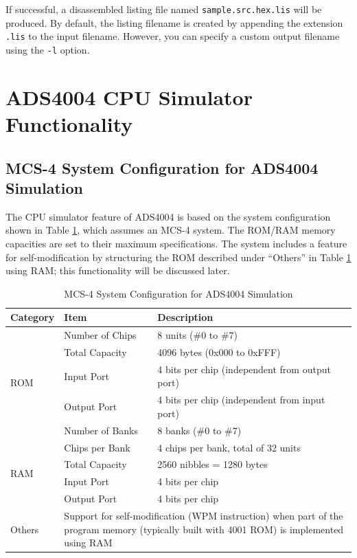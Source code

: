 If successful, a disassembled listing file named \texttt{sample.src.hex.lis} will be produced.  
By default, the listing filename is created by appending the extension \texttt{.lis} to the input filename.  
However, you can specify a custom output filename using the \texttt{-l} option.

\section{ADS4004 CPU Simulator Functionality}
\subsection{MCS-4 System Configuration for ADS4004 Simulation}
The CPU simulator feature of ADS4004 is based on the system configuration shown in Table \ref{tb:ADS4004SYSTEMCONFIG}, which assumes an MCS-4 system.  
The ROM/RAM memory capacities are set to their maximum specifications.  
The system includes a feature for self-modification by structuring the ROM described under ``Others'' in Table \ref{tb:ADS4004SYSTEMCONFIG} using RAM; this functionality will be discussed later.

\begin{table}
\centering
\begin{tabular}{|l|l|p{9cm}|}
\hline
\rowcolor{LightPurple}
\textbf{Category} & \textbf{Item} & \textbf{Description} \\
\hline
\multirow{5}{*}{ROM} & Number of Chips & 8 units (\#0 to \#7) \\
\cline{2-3}
 & Total Capacity & 4096 bytes (0x000 to 0xFFF) \\
\cline{2-3}
 & Input Port & 4 bits per chip (independent from output port) \\
\cline{2-3}
 & Output Port & 4 bits per chip (independent from input port) \\
\cline{2-3}
 & Number of Banks & 8 banks (\#0 to \#7) \\
\hline
\multirow{4}{*}{RAM} & Chips per Bank & 4 chips per bank, total of 32 units \\
\cline{2-3}
 & Total Capacity & 2560 nibbles = 1280 bytes \\
\cline{2-3}
 & Input Port & 4 bits per chip \\
\cline{2-3}
 & Output Port & 4 bits per chip \\
\hline
Others & \multicolumn{2}{p{11cm}|}{Support for self-modification (WPM instruction) when part of the program memory (typically built with 4001 ROM) is implemented using RAM} \\
\hline
\end{tabular}
\caption{MCS-4 System Configuration for ADS4004 Simulation}
\label{tb:ADS4004SYSTEMCONFIG}
\end{table}


